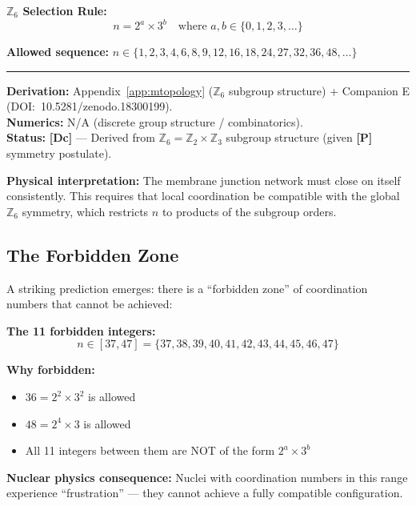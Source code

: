 \documentclass[11pt,a4paper]{article}
\newcommand{\tagP}{\textcolor{red!70!black}{\textbf{[P]}}}
\newcommand{\tagDc}{\textcolor{blue!70!black}{\textbf{[Dc]}}}
\begin{document}
\begin{resultbox}
\textbf{$\mathbb{Z}_6$ Selection Rule:}
\begin{equation}
    n = 2^a \times 3^b \quad \text{where } a, b \in \{0, 1, 2, 3, \ldots\}
    \label{eq:allowed_n}
\end{equation}

\textbf{Allowed sequence:} $n \in \{1, 2, 3, 4, 6, 8, 9, 12, 16, 18, 24, 27, 32, 36, 48, \ldots\}$

\vspace{0.3em}\hrule\vspace{0.3em}
\textbf{Derivation:} Appendix~\ref{app:mtopology} ($\mathbb{Z}_6$ subgroup structure) + Companion E (DOI:~10.5281/zenodo.18300199).\\
\textbf{Numerics:} N/A (discrete group structure / combinatorics).\\
\textbf{Status:} \tagDc{} --- Derived from $\mathbb{Z}_6 = \mathbb{Z}_2 \times \mathbb{Z}_3$ subgroup structure (given \tagP{} symmetry postulate).
\end{resultbox}

\textbf{Physical interpretation:} The membrane junction network must close on itself consistently. This requires that local coordination be compatible with the global $\mathbb{Z}_6$ symmetry, which restricts $n$ to products of the subgroup orders.

\subsection{The Forbidden Zone}

A striking prediction emerges: there is a ``forbidden zone'' of coordination numbers that cannot be achieved:

\begin{warnbox}[title={\textbf{Forbidden Zone}}]
\textbf{The 11 forbidden integers:}
\begin{equation}
    n \in [37, 47] = \{37, 38, 39, 40, 41, 42, 43, 44, 45, 46, 47\}
\end{equation}

\textbf{Why forbidden:}
\begin{itemize}[nosep]
    \item $36 = 2^2 \times 3^2$ is allowed
    \item $48 = 2^4 \times 3$ is allowed
    \item All 11 integers between them are NOT of the form $2^a \times 3^b$
\end{itemize}

\textbf{Nuclear physics consequence:} Nuclei with coordination numbers in this range experience ``frustration'' --- they cannot achieve a fully compatible configuration.
\end{warnbox}
\end{document}
